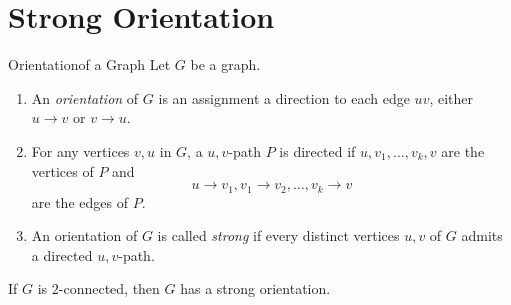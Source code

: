 \documentclass[co342]{subfiles}
\begin{document}
    \section{Strong Orientation}
    
    \begin{definition}{Orientation}{of a Graph}
        Let $G$ be a graph.
        \begin{enumerate}
            \item An \emph{orientation} of $G$ is an assignment a direction to each edge $uv$, either $u\to v$ or $v\to u$.
            \item For any vertices $v,u$ in $G$, a $u,v$-path $P$ is directed if $u,v_1,\ldots,v_k,v$ are the vertices of $P$ and
                \begin{equation*}
                    u\to v_1, v_1\to v_2, \ldots, v_k\to v
                \end{equation*}
                are the edges of $P$.
            \item An orientation of $G$ is called \emph{strong} if every distinct vertices $u,v$ of $G$ admits a directed $u,v$-path.
        \end{enumerate}
    \end{definition}

    \clearpage
    \begin{prop}{}
        If $G$ is $2$-connected, then $G$ has a strong orientation.
    \end{prop}
\end{document}
